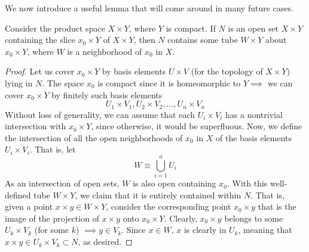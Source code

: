     We now introduce a useful lemma that will come around in many future cases. 

    \begin{lemma}
      Consider the product space $X \times Y$, where $Y$ is compact. If $N$ is an open set $X \times Y$ containing the slice $x_0 \times Y$ of $X \times Y$, then $N$ contains some tube $W \times Y$ about $x_0 \times Y$, where $W$ is a neighborhood of $x_0$ in $X$. 

      \begin{figure}[H]
        \centering 
        \label{fig:tube_lemma}
      \end{figure}
    \end{lemma}
    \begin{proof}
      Let us cover $x_0 \times Y$ by basis elements $U \times V$ (for the topology of $X \times Y$) lying in $N$. The space $x_0$ is compact since it is homeomorphic to $Y \implies$ we can cover $x_0 \times Y$ by finitely such basis elements
      \begin{equation}
        U_1 \times V_1, U_2 \times V_2, \ldots , U_n \times V_n
      \end{equation}
      Without loss of generality, we can assume that each $U_i \times V_i$ has a nontrivial intersection with $x_0 \times Y$, since otherwise, it would be superfluous. Now, we define the intersection of all the open neighborhoods of $x_0$ in $X$ of the basis elements $U_i \times V_i$. That is, let
      \begin{equation}
        W \equiv \bigcup_{i=1}^n U_i
      \end{equation}
      As an intersection of open sets, $W$ is also open containing $x_0$. With this well-defined tube $W \times Y$, we claim that it is entirely contained within $N$. That is, given a point $x \times y \in W \times Y$, consider the corresponding point $x_0 \times y$ that is the image of the projection of $x\times y$ onto $x_0 \times Y$. Clearly, $x_0 \times y$ belongs to some $U_k \times V_k$ (for some $k$) $\implies y \in V_k$. Since $x \in W$, $x$ is clearly in $U_k$, meaning that $x \times y \in U_k \times V_k \subset N$, as desired. 
    \end{proof}

